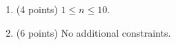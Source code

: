\begin{enumerate}
    \tightlist
    \item (4 points) $1 \leq n \leq 10$.
    \item (6 points) No additional constraints.
\end{enumerate}
    